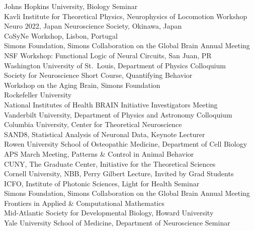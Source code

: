 \documentclass[11pt]{article}
\begin{document}
Johns Hopkins University, Biology Seminar \\
Kavli Institute for Theoretical Physics, Neurophysics of Locomotion Workshop  \\
Neuro 2022, Japan Neuroscience Society, Okinawa, Japan \\
CoSyNe Workshop, Lisbon, Portugal\\ 
Simons Foundation, Simons Collaboration on the Global Brain Annual Meeting \\
NSF Workshop: Functional Logic of Neural Circuits, San Juan, PR \\
Washington University of St.~Louis, Department of Physics Colloquium \\
Society for Neuroscience Short Course, Quantifying Behavior \\
Workshop on the Aging Brain, Simons Foundation \\
Rockefeller University \\
National Institutes of Health BRAIN Initiative Investigators Meeting \\
Vanderbilt University, Department of Physics and Astronomy Colloquium \\
Columbia University, Center for Theoretical Neuroscience \\
SAND8, Statistical Analysis of Neuronal Data, Keynote Lecturer \\
Rowen University School of Osteopathic Medicine, Department of Cell Biology \\
APS March Meeting, Patterns \& Control in Animal Behavior \\
CUNY, The Graduate Center, Initiative for the Theoretical Sciences\\
Cornell University, NBB, Perry Gilbert Lecture, Invited by Grad Students\\
ICFO, Institute of Photonic Sciences, Light for Health Seminar  \\
Simons Foundation, Simons Collaboration on the Global Brain Annual Meeting  \\ 
Frontiers in Applied \& Computational Mathematics\\
Mid-Atlantic Society for Developmental Biology, Howard University \\
Yale University School of Medicine, Department of Neuroscience Seminar \\
\end{document}

